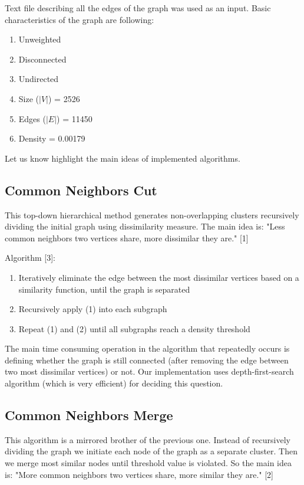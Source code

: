 \documentclass[journal]{IEEEtran}
\begin{document}
Text file describing all the edges of the graph was used as an input. Basic characteristics of the graph are following:
\begin{enumerate}
	\item Unweighted
	\item Disconnected 
	\item Undirected
	\item Size ($|V|$) = 2526
	\item Edges ($|E|$) = 11450
	\item Density = 0.00179
\end{enumerate}

Let us know highlight the main ideas of implemented algorithms.

\subsection{Common Neighbors Cut}
This top-down hierarchical method generates non-overlapping clusters recursively dividing the initial graph using dissimilarity measure. The main idea is: "Less common neighbors two vertices share, more dissimilar they are." [1]

Algorithm [3]:
\begin{enumerate}
	\item Iteratively eliminate the edge between the most dissimilar vertices
	based on a similarity function, until the graph is separated
	\item Recursively apply (1) into each subgraph
	\item Repeat (1) and (2) until all subgraphs reach a density threshold
\end{enumerate}

The main time consuming operation in the algorithm that repeatedly occurs is defining whether the graph is still connected (after removing the edge between two most dissimilar vertices) or not. Our implementation uses depth-first-search algorithm (which is very efficient) for deciding this question. 

\subsection{Common Neighbors Merge}
This algorithm is a mirrored brother of the previous one. Instead of recursively dividing the graph we initiate each node of the graph as a separate cluster. Then we merge most similar nodes until threshold value is violated. So the main idea is: "More common neighbors two vertices share, more similar they are." [2]
\end{document}
